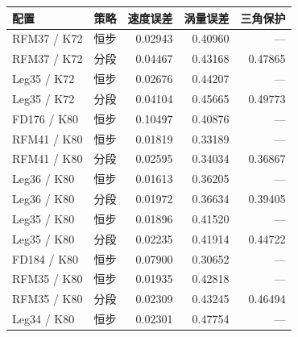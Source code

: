 \begin{tabularx}{\linewidth}{@{}Xlrrr@{}}
\toprule
配置 & 策略 & 速度误差 & 涡量误差 & 三角保护 \\
\midrule
RFM37 / K72 & 恒步 & 0.02943 & 0.40960 & — \\
RFM37 / K72 & 分段 & 0.04467 & 0.43168 & 0.47865 \\
Leg35 / K72 & 恒步 & 0.02676 & 0.44207 & — \\
Leg35 / K72 & 分段 & 0.04104 & 0.45665 & 0.49773 \\
FD176 / K80 & 恒步 & 0.10497 & 0.40876 & — \\
RFM41 / K80 & 恒步 & 0.01819 & 0.33189 & — \\
RFM41 / K80 & 分段 & 0.02595 & 0.34034 & 0.36867 \\
Leg36 / K80 & 恒步 & 0.01613 & 0.36205 & — \\
Leg36 / K80 & 分段 & 0.01972 & 0.36634 & 0.39405 \\
Leg35 / K80 & 恒步 & 0.01896 & 0.41520 & — \\
Leg35 / K80 & 分段 & 0.02235 & 0.41914 & 0.44722 \\
FD184 / K80 & 恒步 & 0.07900 & 0.30652 & — \\
RFM35 / K80 & 恒步 & 0.01935 & 0.42818 & — \\
RFM35 / K80 & 分段 & 0.02309 & 0.43245 & 0.46494 \\
Leg34 / K80 & 恒步 & 0.02301 & 0.47754 & — \\
\bottomrule
\end{tabularx}
